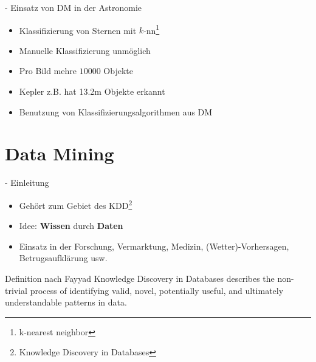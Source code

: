 \documentclass[fleqn,11pt,aspectratio=43]{beamer}
\begin{document}
\begin{frame}{\insertsectionhead - Einsatz von DM in der Astronomie}
\begin{itemize}
\item Klassifizierung von Sternen mit $k$-nn\footnote{k-nearest neighbor}
\item Manuelle Klassifizierung unmöglich  \cite{ester2000knowledge}
\item Pro Bild mehre $10000$ Objekte
\item Kepler z.B. hat 13.2m Objekte erkannt
\item Benutzung von Klassifizierungsalgorithmen aus DM
\end{itemize}
\end{frame}

\section{Data Mining~}

\begin{frame}{\insertsectionhead - Einleitung \cite{ester2000knowledge}}
\begin{itemize}
\item Gehört zum Gebiet des KDD\footnote{Knowledge Discovery in Databases}
\item Idee: \textbf{Wissen} durch \textbf{Daten}
\item Einsatz in der Forschung, Vermarktung, Medizin, (Wetter)-Vorhersagen, 
Betrugsaufklärung usw.
\end{itemize}
\begin{block}{Definition nach Fayyad \cite{fayyad1996data}}
Knowledge Discovery in Databases describes the non-trivial process of 
identifying valid, novel, potentially useful, and ultimately understandable 
patterns in data.
\end{block}
\end{frame}
\end{document}

